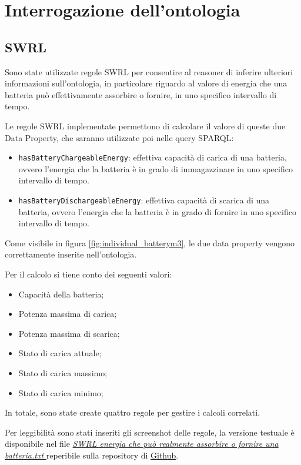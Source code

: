 \chapter{Interrogazione dell'ontologia}

\section{SWRL}\label{sec:swrl}
Sono state utilizzate regole SWRL per consentire al reasoner di inferire ulteriori informazioni sull'ontologia, in particolare riguardo al valore di energia che una batteria può effettivamente assorbire o fornire, in uno specifico intervallo di tempo.

Le regole SWRL implementate permettono di calcolare il valore di queste due Data Property, che saranno utilizzate poi nelle query SPARQL:
\begin{itemize}
    \item \texttt{hasBatteryChargeableEnergy}: effettiva capacità di carica di una batteria, ovvero l'energia che la batteria è in grado di immagazzinare in uno specifico intervallo di tempo.
    \item \texttt{hasBatteryDischargeableEnergy}: effettiva capacità di scarica di una batteria, ovvero l'energia che la batteria è in grado di fornire in uno specifico intervallo di tempo.
\end{itemize}

Come visibile in figura \ref{fig:individual_batterym3}, le due data property vengono correttamente inserite nell'ontologia.

Per il calcolo si tiene conto dei seguenti valori:
\begin{itemize}
    \item Capacità della batteria;
    \item Potenza massima di carica;
    \item Potenza massima di scarica;
    \item Stato di carica attuale;
    \item Stato di carica massimo;
    \item Stato di carica minimo;
\end{itemize}


In totale, sono state create quattro regole per gestire i calcoli correlati.


Per leggibilità sono stati inseriti gli screenshot delle regole, la versione testuale è disponibile nel file \href{https://github.com/19eddie/SemanticWeb-Assignment02-03/blob/main/SWRL%20energia%20che%20pu%C3%B2%20realmente%20assorbire%20o%20fornire%20una%20batteria.txt}{\textit{SWRL energia che può realmente assorbire o fornire una batteria.txt}
} reperibile sulla repository di \href{https://github.com/19eddie/SemanticWeb-Assignment02-03}{Github}. \\

